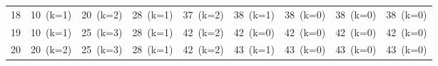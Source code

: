 \documentclass[12pt]{article}
\begin{document}
\begin{landscape}
\begin{longtable}{ccccccccc}
18 & \cellcolor{green!40}10~(k=1) & \cellcolor{green!40}20~(k=2) & \cellcolor{green!40}28~(k=1) & \cellcolor{green!40}37~(k=2) & \cellcolor{green!40}38~(k=1) & \cellcolor{red!20}38~(k=0) & \cellcolor{red!20}38~(k=0) & \cellcolor{red!20}38~(k=0) \\
19 & \cellcolor{green!40}10~(k=1) & \cellcolor{green!40}25~(k=3) & \cellcolor{green!40}28~(k=1) & \cellcolor{green!40}42~(k=2) & \cellcolor{red!20}42~(k=0) & \cellcolor{red!20}42~(k=0) & \cellcolor{red!20}42~(k=0) & \cellcolor{red!20}42~(k=0) \\
20 & \cellcolor{green!40}20~(k=2) & \cellcolor{green!40}25~(k=3) & \cellcolor{green!40}28~(k=1) & \cellcolor{green!40}42~(k=2) & \cellcolor{green!40}43~(k=1) & \cellcolor{red!20}43~(k=0) & \cellcolor{red!20}43~(k=0) & \cellcolor{red!20}43~(k=0) \\
\bottomrule
\end{longtable}
\end{landscape}
\end{document}
